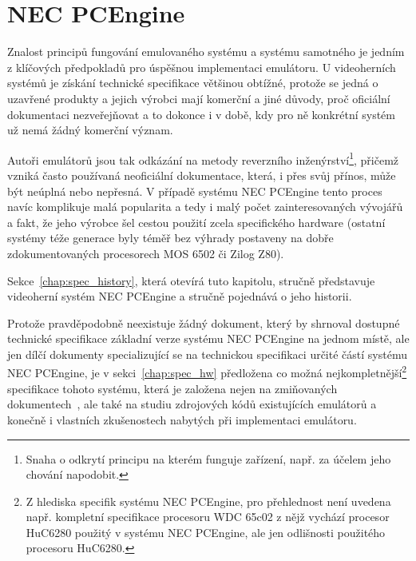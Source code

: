
\chapter{NEC PCEngine}\label{chap:spec}

Znalost principů fungování emulovaného systému a systému samotného je jedním z
klíčových předpokladů pro úspěšnou implementaci emulátoru. U videoherních
systémů je získání technické specifikace většinou obtížné, protože se jedná o
uzavřené produkty a jejich výrobci mají komerční a jiné důvody, proč oficiální
dokumentaci nezveřejňovat a to dokonce i v době, kdy pro ně konkrétní systém už
nemá žádný komerční význam.

Autoři emulátorů jsou tak odkázání na metody reverzního
inženýrství\footnote{Snaha o odkrytí principu na kterém funguje zařízení, např.
za účelem jeho chování napodobit.}, přičemž vzniká často používaná neoficiální
dokumentace, která, i přes svůj přínos, může být neúplná nebo nepřesná. V
případě systému NEC PCEngine tento proces navíc komplikuje malá popularita a
tedy i malý počet zainteresovaných vývojářů a fakt, že jeho výrobce šel cestou
použití zcela specifického hardware (ostatní systémy téže generace byly téměř
bez výhrady postaveny na dobře zdokumentovaných procesorech MOS 6502 či Zilog
Z80).

Sekce~\ref{chap:spec_history}, která otevírá tuto kapitolu, stručně představuje
videoherní systém NEC PCEngine a stručně pojednává o jeho historii.

Protože pravděpodobně neexistuje žádný dokument, který by shrnoval dostupné
technické specifikace základní verze systému NEC PCEngine na jednom místě, ale
jen dílčí dokumenty specializující se na technickou specifikaci určité částí
systému NEC PCEngine, je v sekci~\ref{chap:spec_hw} předložena co možná
nejkompletnější\footnote{Z hlediska specifik systému NEC PCEngine, pro
přehlednost není uvedena např. kompletní specifikace procesoru WDC 65c02 z nějž
vychází procesor HuC6280 použitý v systému NEC PCEngine, ale jen odlišnosti
použitého procesoru HuC6280.} specifikace tohoto systému, která je založena
nejen na zmiňovaných dokumentech~\cite{Ormston06, MacDonald02, Schleussinger98,
Clifford, Woodford94, LaMothe05, www65c02}, ale také na studiu zdrojových kódů
existujících emulátorů \cite{wwwMednafen, wwwOotake} a konečně i vlastních
zkušenostech nabytých při implementaci emulátoru.

